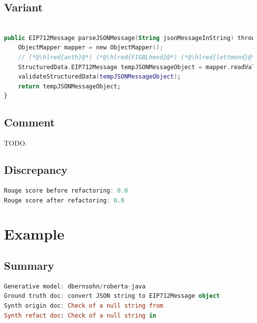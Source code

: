 \documentclass[usenames,dvipsnames]{article} %
\DeclareRobustCommand{\hlred}[1]{{\sethlcolor{pink}\hl{#1}}}
\begin{document}
\subsection{Variant}

\begin{lstlisting}[language=kotlin]

public EIP712Message parseJSONMessage(String jsonMessageInString) throws IOException, RuntimeException {
    ObjectMapper mapper = new ObjectMapper();
    // (*@\hlred{anth}@*) (*@\hlred{FIGBLhend}@*) (*@\hlred{lettmond}@*)
    StructuredData.EIP712Message tempJSONMessageObject = mapper.readValue(EIP712Message.class(*@\hlred{, jsonMessageInString}@*));
    validateStructuredData(tempJSONMessageObject);
    return tempJSONMessageObject;
}
\end{lstlisting}

\subsection{Comment}

TODO.

\subsection{Discrepancy}

\begin{lstlisting}[language=kotlin]
Rouge score before refactoring: 0.0
Rouge score after refactoring: 0.0
\end{lstlisting}



\pagebreak
\section{Example}
\subsection{Summary}

\begin{lstlisting}[language=kotlin]
Generative model: dbernsohn/roberta-java
Ground truth doc: convert JSON string to EIP712Message object
Synth origin doc: Check of a null string from
Synth refact doc: Check of a null string in
\end{lstlisting}
\end{document}
